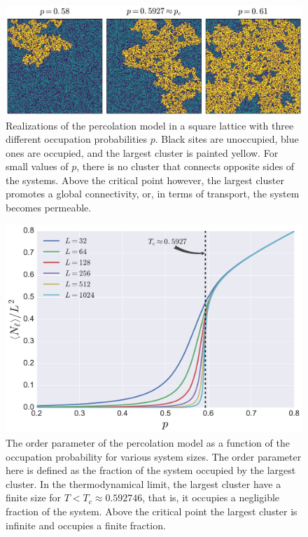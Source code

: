 \begin{figure}
\begin{center}
    \includegraphics[scale=0.4]{chapters/ch2-crit/figs/isoperco}
\end{center}
\caption{Realizations of the percolation model in a square lattice with three
    different occupation probabilities $p$. Black sites are unoccupied, blue
    ones are occupied, and the largest cluster is painted yellow. For small
    values of $p$, there is no cluster that connects opposite sides of the
    systems. Above the critical point however, the largest cluster promotes a
    global connectivity, or, in terms of transport, the system becomes
    permeable.}
\label{fig:isoperco}
\end{figure}

\begin{figure}
\begin{center}
    \includegraphics[scale=0.4]{chapters/ch2-crit/figs/isoperco2}
\end{center}
\caption{The order parameter of the percolation model as a function of the
    occupation probability for various system sizes. The order parameter here
    is defined as the fraction of the system occupied by the largest cluster.
    In the thermodynamical limit, the largest cluster have a finite size for
    $T<T_c\approx 0.592746$, that is, it occupies a negligible fraction of the
    system. Above the critical point the largest cluster is infinite and occupies
    a finite fraction.}
\label{fig:isoperco2}
\end{figure}

